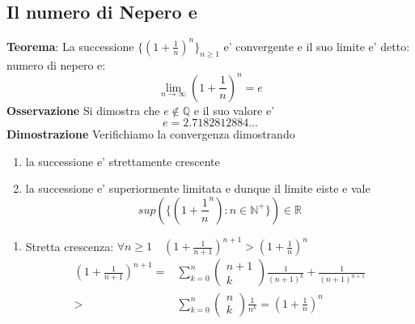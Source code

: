 \documentclass{article}
\begin{document}
        \subsection{Il numero di Nepero e}
        \begin{flushleft}
            \textbf{Teorema}: La successione $\{(1+\frac{1}{n})^n\}_{n \geq 1}$ e' convergente
            e il suo limite e' detto: numero di nepero e:
            \begin{equation}
                \lim_{n \to \infty}(1+\frac{1}{n})^n= e
            \end{equation}
            \textbf{Osservazione} Si dimostra che $e \notin \mathbb{Q}$ e il suo valore e'
            \begin{equation}
               e=2.7182812884...
            \end{equation}
            \textbf{Dimostrazione} Verifichiamo la convergenza dimostrando
            \begin{enumerate}
                \item la successione e' strettamente crescente
                \item la successione e' superiormente limitata e dunque il limite eiste e vale
                    \begin{equation}
                        sup(\{(1+\frac{1}{n}^n):n\in \mathbb{N}^+\}) \in \mathbb{R}
                    \end{equation}
            \end{enumerate}
            \begin{enumerate}
                \item Stretta crescenza: $\forall n \geq 1 \quad (1+ \frac{1}{n+1})^{n+1} > (1+\frac{1}{n})^n$
                    \begin{equation}
                        \begin{aligned}
                            (1+ \frac{1}{n+1})^{n+1}=  & \sum_{k=0}^n
                        \begin{pmatrix}
                            n+1 \\
                            k
                        \end{pmatrix} \frac{1}{(n+1)^k}+\frac{1}{(n+1)^{n+1}}\\
                            > & \sum_{k=0}^{n}
                            \begin{pmatrix}
                                n \\
                                k
                            \end{pmatrix} \frac{1}{n^k}=(1+\frac{1}{n})^n

\end{aligned}
\end{equation}
\end{enumerate}
\end{flushleft}
\end{document}
